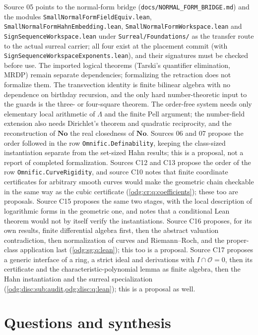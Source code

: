 \documentclass[11pt,oneside]{article}
\numberwithin{equation}{section}
\theoremstyle{definition}
\theoremstyle{remark}
\newcommand{\No}{\mathbf{No}}
\newcommand{\fn}[1]{\nolinkurl{#1}}
\begin{document}
Source 05 points to the normal-form bridge (\fn{docs/NORMAL_FORM_BRIDGE.md})
and the modules \fn{SmallNormalFormFieldEquiv.lean},
\fn{SmallNormalFormHahnEmbedding.lean},
\fn{SmallNormalFormWorkspace.lean} and \fn{SignSequenceWorkspace.lean}
under \fn{Surreal/Foundations/} as the transfer route to the actual
surreal carrier; all four exist at the placement commit (with
\fn{SignSequenceWorkspaceExponents.lean}), and their signatures must be
checked before use. The imported logical theorems (Tarski's quantifier
elimination, MRDP) remain separate dependencies; formalizing the retraction
does not formalize them. The transvection identity is finite bilinear
algebra with no dependence on birthday recursion, and the only hard
number-theoretic input to the guards is the three- or four-square theorem.
The order-free system needs only elementary local arithmetic of $\Lambda$ and
the finite Pell argument; the number-field extension also needs Dirichlet's
theorem and quadratic reciprocity, and the reconstruction of $\No$ the real
closedness of $\No$. Sources 06 and 07 propose the order followed in the row
\fn{Omnific.Definability}, keeping the class-sized instantiation separate from
the set-sized Hahn results; this is a proposal, not a report of completed
formalization. Sources C12 and C13 propose the order of the row
\fn{Omnific.CurveRigidity}, and source C10 notes that finite coordinate certificates
for arbitrary smooth curves would make the geometric chain checkable in the same way
as the cubic certificate (\cref{odg:cr:q:coefficients}); these too are proposals.
Source C15 proposes the same two stages, with the local description of logarithmic
forms in the geometric one, and notes that a conditional Lean theorem would not by
itself verify the instantiations. Source C16 proposes, for its own results, finite differential algebra first,
then the abstract valuation contradiction, then normalization of curves and
Riemann--Roch, and the proper-class application last (\cref{odg:sg:q:lean}); this too is a
proposal. Source C17 proposes a generic interface of a ring, a strict ideal and derivations
with $I\cap\mathcal O=0$, then its certificate and the characteristic-polynomial lemma as
finite algebra, then the Hahn instantiation and the surreal specialization
(\cref{odg:disc:sub:audit,odg:disc:q:lean}); this is a proposal as well.

\section{Questions and synthesis}\label{odg:sec:questions}
\end{document}
